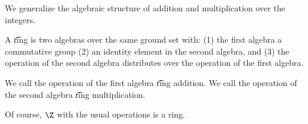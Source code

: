 

We generalize the algebraic structure of addition and multiplication over the integers.


A \t{ring} is two algebras over the same ground set with:
(1) the first algebra a commutative group
(2) an identity element in the second algebra,
and
(3) the operation of the second algebra
distributes over the operation of the first
algebra.

We call the operation of the first algebra
\t{ring addition}.
We call the operation of the second algebra
\t{ring multiplication}.


Of course, $\Z$ with the usual operations is a ring.

\blankpage
